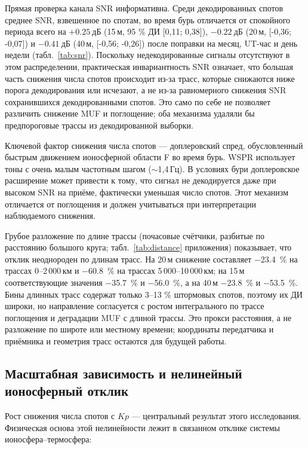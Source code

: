 \documentclass{agujournal2019}
\begin{document}
Прямая проверка канала SNR информативна. Среди декодированных спотов
среднее SNR, взвешенное по спотам, во время бурь отличается от спокойного
периода всего на $+\SI{0.25}{\mbox{дБ}}$ (15\,м, 95 \% ДИ [0,11; 0,38]),
$-\SI{0.22}{\mbox{дБ}}$ (20\,м, [-0,36; -0,07]) и $-\SI{0.41}{\mbox{дБ}}$ (40\,м,
[-0,56; -0,26]) после поправки на месяц, UT-час и день недели (табл.~\ref{tab:snr}).
Поскольку недекодированные сигналы отсутствуют в этом
распределении, практическая инвариантность SNR означает, что большая часть снижения
числа спотов происходит из-за трасс, которые снижаются ниже порога декодирования или
исчезают, а не из-за равномерного снижения SNR сохранившихся декодированными спотов. Это само
по себе не позволяет различить снижение MUF и поглощение; оба механизма удаляли бы
предпороговые трассы из декодированной выборки.

Ключевой фактор снижения числа спотов --- доплеровский спред,
обусловленный быстрым движением ионосферной области F во время
бурь. WSPR использует тоны с очень малым частотным шагом
($\sim$1,4\,\mbox{Гц}). В условиях бури доплеровское расширение
может привести к тому, что сигнал не декодируется даже при высоком
SNR на приёме, фактически уменьшая число спотов. Этот механизм
отличается от поглощения и должен учитываться при интерпретации
наблюдаемого снижения.

Грубое разложение по длине трассы (почасовые счётчики, разбитые по
расстоянию большого круга; табл.~\ref{tab:distance} приложения) показывает,
что отклик неоднороден по длинам трасс. На 20\,м снижение составляет
\SI{-23.4}{\percent} на трассах 0--2\,000\,км и \SI{-60.8}{\percent} на
трассах 5\,000--10\,000\,км; на 15\,м соответствующие значения
\SI{-35.7}{\percent} и \SI{-56.0}{\percent}, а на 40\,м
\SI{-23.8}{\percent} и \SI{-53.5}{\percent}. Бины длинных трасс содержат
только 3--13 \% штормовых спотов, поэтому их ДИ широки, но направление
согласуется с ростом интегрального по трассе поглощения и деградации MUF
с длиной трассы. Это прокси расстояния, а не разложение по широте или
местному времени; координаты передатчика и приёмника и геометрия трасс
остаются для будущей работы.

\subsection{Масштабная зависимость и нелинейный ионосферный отклик}

Рост снижения числа спотов с $Kp$ — центральный результат этого
исследования. Физическая основа этой нелинейности лежит в связанном отклике
системы ионосфера--термосфера:
\end{document}

